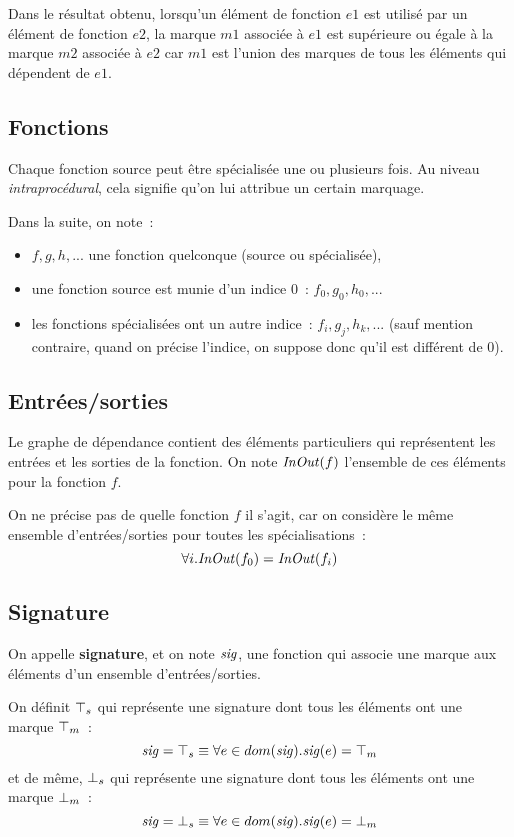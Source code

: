 Dans le résultat obtenu, lorsqu'un élément de fonction $e1$ est utilisé par un
élément de fonction $e2$, la marque $m1$ associée à $e1$ 
est supérieure ou
égale à la marque $m2$ associée à $e2$ car  $m1$ est l'union des marques
de tous les éléments qui dépendent de $e1$.

\subsection{Fonctions}

Chaque fonction source peut être spécialisée une ou plusieurs fois. 
Au niveau {\it intraprocédural},
cela signifie qu'on lui attribue un certain marquage.\bb

Dans la suite, on note~:
\begin{itemize}
  \item $f, g, h, ...$ une fonction quelconque (source ou spécialisée),
  \item une fonction source est munie d'un indice 0~: $f_0, g_0, h_0, ...$
  \item les fonctions spécialisées ont un autre indice~: $f_i, g_j, h_k, ...$
    (sauf mention contraire, quand on précise l'indice, 
    on suppose donc qu'il est différent de 0).
\end{itemize}

\subsection{Entrées/sorties}

Le graphe de dépendance contient des éléments particuliers qui représentent
les entrées et les sorties de la fonction.
On note $\mathit{InOut}(f)$ l'ensemble de ces éléments pour la fonction $f$.\bb

On ne précise pas de quelle fonction $f$ il s'agit, car on considère le même
ensemble d'entrées/sorties pour toutes les spécialisations~:
\begin{equation*}
    \forall i. \mathit{InOut}(f_0) = \mathit{InOut}(f_i)
\end{equation*}

\subsection{Signature}

On appelle {\bf signature}, et on note $\mathit{sig}$, une fonction 
qui associe une marque aux éléments d'un ensemble d'entrées/sorties.

On définit ${\top}_s$ qui représente une signature dont tous les éléments
ont une marque ${\top}_m$~:
\begin{equation*}
\mathit{sig} = {\top}_s \equiv \forall e \in dom(\mathit{sig}). \mathit{sig}(e) = {\top}_m
\end{equation*}
et de même, ${\bot}_s$ qui représente une signature dont tous les éléments 
ont une marque ${\bot}_m$~:
\begin{equation*}
\mathit{sig} = {\bot}_s \equiv \forall e \in dom(\mathit{sig}). \mathit{sig}(e) = {\bot}_m
\end{equation*}

